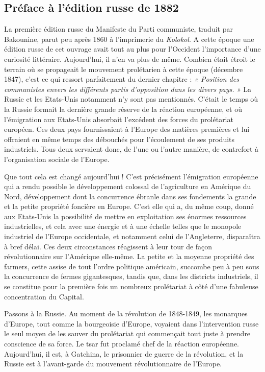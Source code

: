 \documentclass[french,twoside]{book} %
\begin{document}
\subsection[Préface à l’édition russe de 1882]{Préface à l’édition russe de 1882}
\noindent La première édition russe du Manifeste du Parti communiste, traduit par Bakounine, parut peu après 1860 à l’imprimerie du \emph{Kolokol}. A cette époque une édition russe de cet ouvrage avait tout au plus pour l’Occident l’importance d’une curiosité littéraire. Aujourd’hui, il n’en va plus de même. Combien était étroit le terrain où se propageait le mouvement prolétarien à cette époque (décembre 1847), c’est ce qui ressort parfaitement du dernier chapitre : \emph{« Position des communistes envers les différents partis d’opposition dans les divers pays. »} La Russie et les Etats-Unis notamment n’y sont pas mentionnés. C'était le temps où la Russie formait la dernière grande réserve de la réaction européenne, et où l’émigration aux Etats-Unis absorbait l’excédent des forces du prolétariat européen. Ces deux pays fournissaient à l’Europe des matières premières et lui offraient en même temps des débouchés pour l’écoulement de ses produits industriels. Tous deux servaient donc, de l’une ou l’autre manière, de contrefort à l’organisation sociale de l’Europe.\par
Que tout cela est changé aujourd’hui ! C'est précisément l’émigration européenne qui a rendu possible le développement colossal de l’agriculture en Amérique du Nord, développement dont la concurrence ébranle dans ses fondements la grande et la petite propriété foncière en Europe. C'est elle qui a, du même coup, donné aux Etats-Unis la possibilité de mettre en exploitation ses énormes ressources industrielles, et cela avec une énergie et à une échelle telles que le monopole industriel de l’Europe occidentale, et notamment celui de l’Angleterre, disparaîtra à bref délai. Ces deux circonstances réagissent à leur tour de façon révolutionnaire sur l’Amérique elle-même. La petite et la moyenne propriété des farmers, cette assise de tout l’ordre politique américain, succombe peu à peu sous la concurrence de fermes gigantesques, tandis que, dans les districts industriels, il se constitue pour la première fois un nombreux prolétariat à côté d’une fabuleuse concentration du Capital.\par
Passons à la Russie. Au moment de la révolution de 1848-1849, les monarques d’Europe, tout comme la bourgeoisie d’Europe, voyaient dans l’intervention russe le seul moyen de les sauver du prolétariat qui commençait tout juste à prendre conscience de sa force. Le tsar fut proclamé chef de la réaction européenne. Aujourd’hui, il est, à Gatchina, le prisonnier de guerre de la révolution, et la Russie est à l’avant-garde du mouvement révolutionnaire de l’Europe.\par
\end{document}
